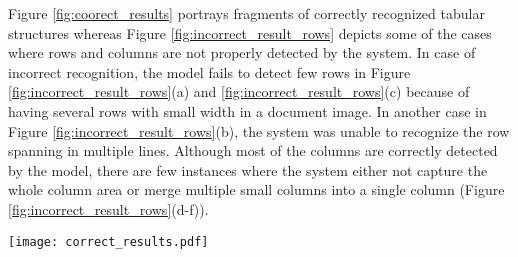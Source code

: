 \documentclass{ieeeaccess}
\begin{document}
Figure \ref{fig:coorect_results} portrays fragments of correctly recognized tabular structures whereas Figure \ref{fig:incorrect_result_rows} depicts some of the cases where rows and columns are not properly detected by the system. In case of incorrect recognition, the model fails to detect few rows in Figure \ref{fig:incorrect_result_rows}(a) and \ref{fig:incorrect_result_rows}(c) because of having several rows with small width in a document image. In another case in Figure \ref{fig:incorrect_result_rows}(b), the system was unable to recognize the row spanning in multiple lines.
Although most of the columns are correctly detected by the model, there are few instances where the system either not capture the whole column area or merge multiple small columns into a single column (Figure \ref{fig:incorrect_result_rows}(d-f)). 

\begin{figure*}[ht]
    \texttt{[image: correct\_results.pdf]}
    \caption{Correctly Recognized Table Structures.}
    \label{fig:coorect_results}
\end{figure*}
\end{document}
